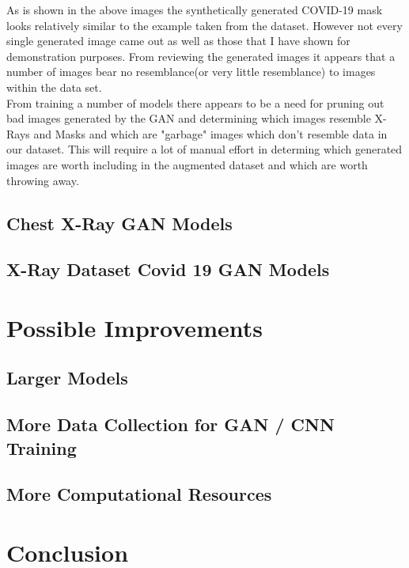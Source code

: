 As is shown in the above images the synthetically generated COVID-19 mask looks relatively similar to the example taken from the dataset.  However not every single generated image came out as well as those that I have shown for demonstration purposes.  From reviewing the generated images it appears that a number of images bear no resemblance(or very little resemblance) to images within the data set.   
\\
From training a number of models there appears to be a need for pruning out bad images generated by the GAN and determining which images resemble X-Rays and Masks and which are "garbage" images which don't resemble data in our dataset.  This will require a lot of manual effort in determing which generated images are worth including in the augmented dataset and which are worth throwing away.
\subsection{Chest X-Ray GAN Models}
\subsection{X-Ray Dataset Covid 19 GAN Models}
\section{Possible Improvements}
\subsection{Larger Models}
\subsection{More Data Collection for GAN / CNN Training}
\subsection{More Computational Resources}
\section{Conclusion}